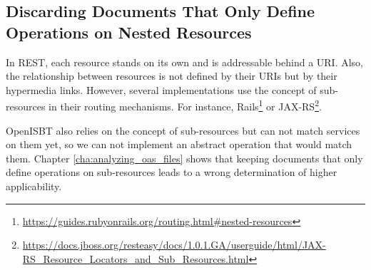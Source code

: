 
\subsection{Discarding Documents That Only Define Operations on Nested Resources} 
In REST, each resource stands on its own and is addressable behind a URI. Also, the relationship between resources is not defined by their URIs but by their hypermedia links. However, several implementations use the concept of sub-resources in their routing mechanisms. For instance, Rails\footnote{\url{https://guides.rubyonrails.org/routing.html\#nested-resources}} or JAX-RS\footnote{\url{https://docs.jboss.org/resteasy/docs/1.0.1.GA/userguide/html/JAX-RS_Resource_Locators_and_Sub_Resources.html}}.

OpenISBT also relies on the concept of sub-resources but can not match services on them yet, so we can not implement an abstract operation that would match them. Chapter \ref{cha:analyzing_oas_files} shows that keeping documents that only define operations on sub-resources leads to a wrong determination of higher applicability.
